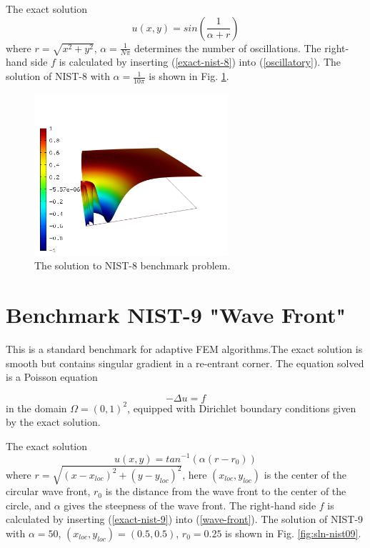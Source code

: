 \documentclass[12pt]{elsarticle}
\begin{document}
The exact solution
\begin{equation}\label{exact-nist-8}
u(x,y) = sin(\frac{1}{\alpha + r})
\end{equation}
where $r = \sqrt{x^{2} + y^{2}}$, $\alpha = \frac{1}{N \pi}$ determines the number of oscillations.
The right-hand side $f$ is calculated by inserting (\ref{exact-nist-8}) into (\ref{oscillatory}).
The solution of NIST-8 with $\alpha = \frac{1}{10 \pi}$ is shown in Fig. \ref{fig:sln-nist08}.

\begin{figure}[!ht]
\centering
\includegraphics[height=6cm]{nist/nist-8/solution.png}
\caption{The solution to NIST-8 benchmark problem.}
\label{fig:sln-nist08}
\end{figure}

\section{Benchmark NIST-9 "Wave Front"}
\label{sec:bench-9}

This is a standard benchmark for adaptive FEM algorithms.The exact solution is smooth
but contains singular gradient in a re-entrant corner.
The equation solved is a Poisson equation

\begin{equation} \label{wave-front}
-\Delta u = f
\end{equation}
in the domain $\Omega = (0, 1)^2$, equipped with Dirichlet boundary conditions
given by the exact solution.

The exact solution
\begin{equation}\label{exact-nist-9}
u(x, y) = tan^{-1}(\alpha (r - r_{0}))
\end{equation}
where $r = \sqrt{(x - x_{loc})^{2} + (y - y_{loc})^{2}}$,
here $(x_{loc}, y_{loc})$ is the center of the circular wave front,
$r_{0}$ is the distance from the wave front to the center of the circle,
and $\alpha$ gives the steepness of the wave front.
The right-hand side $f$ is calculated by inserting (\ref{exact-nist-9}) into (\ref{wave-front}).
The solution of NIST-9 with $\alpha = 50$, $(x_{loc}, y_{loc}) = (0.5, 0.5)$,
$r_{0} = 0.25$ is shown in Fig. \ref{fig:sln-nist09}.
\end{document}
